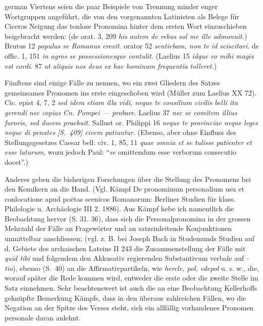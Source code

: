 \begin{otherlanguage*}{german}
Viertens seien die paar Beispiele von Trennung minder enger Wortgruppen angeführt, die von den vorgenannten Latinisten als Belege für Ciceros Neigung das tonlose Pronomina hinter dem ersten Wort einzuschieben beigebracht werden: (de orat. 3, 209 \emph{his autem de rebus sol me ille admonuit.}) Brutus 12 \emph{populus se Romanus erexit}. orator 52 \emph{sentiebam, non te id sciscitari}. de offic. 1, 151 \emph{in agros se possessionesque contulit}. (Laelius 15 \emph{idque eo mihi magis est cordi}. 87 \emph{ut aliquis nos deus ex hac hominum frequentia tolleret.})

Fünftens sind einige Fälle zu nennen, wo ein zwei Gliedern des Satzes gemeinsames Pronomen ins erste eingeschoben wird (Müller zum Laelius XX 72). Cic. epist 4, 7, 2 \emph{sed idem etiam illa vidi, neque te consilium civilis belli ita gerendi nec copias Cn. Pompei — probare}. Laelius 37 \emph{nec se comitem illius furoris, sed ducem praebuit}. Sallust or. Philippi 16 \emph{neque te provinciae neque leges neque di penates} \hypertarget{p409}{\emph{[S.~409]}}\label{p409} \emph{civem patiuntur}. (Ebenso, aber ohne Einfluss des Stellungsgesetzes Caesar bell. civ. 1, 85, 11 \emph{quae omnia et se tulisse patienter et esse laturum}, wozu jedoch Paul: “\emph{se} omittendum esse verborum consecutio docet”.)

Anderes geben die bisherigen Forschungen über die Stellung des Pronomens bei den Komikern an die Hand. (Vgl. Kämpf De pronominum personalium usu et conlocatione apud poëtas scenicos Romanorum: Berliner Studien für klass. Philologie u. Archäologie III 2. 1886). Aus Kämpf hebe ich namentlich die Beobachtung hervor (S. 31. 36), dass sich die Personalpronomina in der grossen Mehrzahl der Fälle an Fragewörter und an satzeinleitende Konjunktionen unmittelbar anschliessen; (vgl. z. B. bei Joseph Bach in Studemunds Studien auf d. Gebiete des archaischen Lateins II 243 die Zusammenstellung der Fälle mit \emph{quid tibi} und folgendem den Akkusativ regierenden Substantivum verbale auf \emph{-tio}), ebenso (S.~40) an die Affirmativpartikeln, wie \emph{hercle, pol, edepol} u. s. w., die, worauf später die Rede kommen wird, entweder die erste oder die zweite Stelle im Satz einnehmen. Sehr beachtenswert ist auch die an eine Beobachtung Kellerhoffs geknüpfte Bemerkung Kämpfs, dass in den überaus zahlreichen Fällen, wo die Negation an der Spitze des Verses steht, sich ein allfällig vorhandenes Pronomen personale daran anlehnt.


\end{otherlanguage*}
